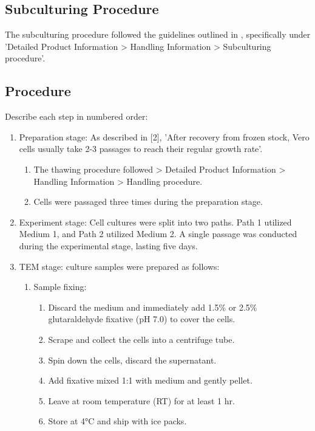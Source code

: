 \documentclass[12pt,a4paper]{article}
\begin{document}
\subsection{Subculturing Procedure}
The subculturing procedure followed the guidelines outlined in \cite{ATCCVERO}, specifically under 'Detailed Product Information > Handling Information > Subculturing procedure'.
\subsection{Procedure}
Describe each step in numbered order:
\begin{enumerate}[label=\arabic*.]
    \item Preparation stage: As described in [2], 'After recovery from frozen stock, Vero cells usually take 2-3 passages to reach their regular growth rate'.
    \begin{enumerate}[label=\alph*.]
        \item The thawing procedure followed \cite{ATCCVERO} > Detailed Product Information > Handling Information > Handling procedure.
        \item Cells were passaged three times during the preparation stage.
    \end{enumerate}
    \item Experiment stage: Cell cultures were split into two paths. Path 1 utilized Medium 1, and Path 2 utilized Medium 2. A single passage was conducted during the experimental stage, lasting five days.
    \item TEM stage: culture samples were prepared as follows:
    \begin{enumerate}[label=\alph*.]
    \item Sample fixing:
        \begin{enumerate}[label=\arabic*.]
            \item Discard the medium and immediately add 1.5\% or 2.5\% glutaraldehyde fixative (pH 7.0) to cover the cells.
            \item Scrape and collect the cells into a centrifuge tube.
            \item Spin down the cells, discard the supernatant.
            \item Add fixative mixed 1:1 with medium and gently pellet. 
            \item Leave at room temperature (RT) for at least 1 hr.
            \item Store at 4°C and ship with ice packs.
        \end{enumerate}

\end{enumerate}
\end{enumerate}
\end{document}
